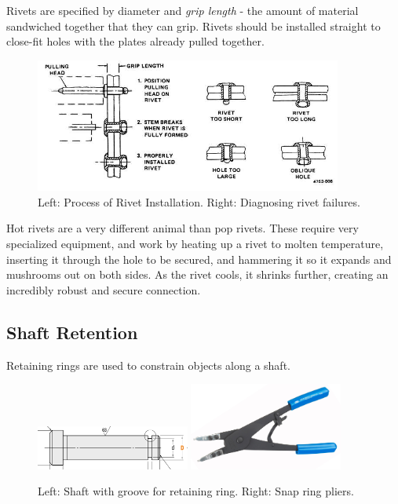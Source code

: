 \documentclass[10pt,letterpaper]{book}
\begin{document}
	Rivets are specified by diameter and \textit{grip length} - the amount of material sandwiched together that they can grip. Rivets should be installed straight to close-fit holes with the plates already pulled together.
	
	\begin{figure}[H] \centering
		\includegraphics[width=0.9\textwidth]{imgs/rivet_install.jpeg}
		\caption{Left: Process of Rivet Installation. Right: Diagnosing rivet failures.}
	\end{figure}
	
	Hot rivets are a very different animal than pop rivets. These require very specialized equipment, and work by heating up a rivet to molten temperature, inserting it through the hole to be secured, and hammering it so it expands and mushrooms out on both sides. As the rivet cools, it shrinks further, creating an incredibly robust and secure connection.	
	
	\subsection{Shaft Retention}
	
	Retaining rings are used to constrain objects along a shaft.
	
	\begin{figure}[H]
		\centering
		\includegraphics[width=0.45\textwidth]{imgs/shaft_snapringgroove.png}
		\includegraphics[width=0.45\textwidth]{imgs/snapringtool.jpeg}
		\caption{Left: Shaft with groove for retaining ring. Right: Snap ring pliers.}
	\end{figure}
	
\end{document}
